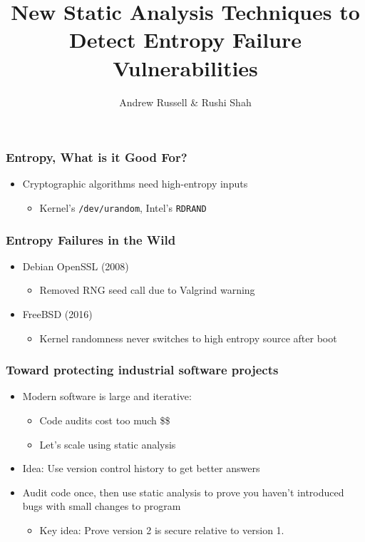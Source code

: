 \documentclass{beamer} %
\title{New Static Analysis Techniques to Detect Entropy Failure Vulnerabilities}
\author{Andrew Russell \& Rushi Shah}
\institute{The University of Texas at Austin}
\theoremstyle{definition} %
\begin{document}
\begin{frame}
\titlepage
\end{frame}


\begin{frame}
\frametitle{Entropy, What is it Good For?}
     \begin{itemize}
         \item Cryptographic algorithms need high-entropy inputs
         \begin{itemize}
             \item Kernel's \texttt{/dev/urandom}, Intel's \texttt{RDRAND}
         \end{itemize}
     \end{itemize}
    \end{frame}

\begin{frame}
\frametitle{Entropy Failures in the Wild}
     \begin{itemize} 
        \item Debian OpenSSL (2008)
        \begin{itemize}
            \item Removed RNG seed call due to Valgrind warning
        \end{itemize}

        \pause

        \item FreeBSD (2016)
        \begin{itemize}
            \item Kernel randomness never switches to high entropy source after boot
       \end{itemize}
	 \end{itemize}
\end{frame}

\begin{frame}
\frametitle{Toward protecting industrial software projects}
\begin{itemize}
    \item Modern software is large and iterative:
    \begin{itemize}
        \item Code audits cost too much \$\$
        \item Let's scale using static analysis
    \end{itemize}
    \pause
    \item Idea: Use version control history to get better answers
    \item Audit code once, then use static analysis to prove you haven't introduced bugs with small changes to program
    \begin{itemize}
        \item Key idea: Prove version 2 is secure relative to version 1.
    \end{itemize}

\end{itemize}
\end{frame}
\end{document}
